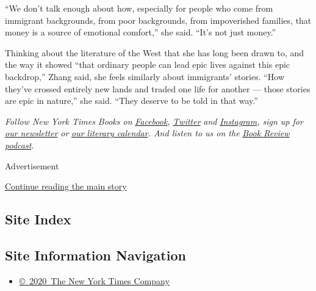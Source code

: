 ``We don't talk enough about how, especially for people who come from
immigrant backgrounds, from poor backgrounds, from impoverished
families, that money is a source of emotional comfort,'' she said.
``It's not just money.''

Thinking about the literature of the West that she has long been drawn
to, and the way it showed ``that ordinary people can lead epic lives
against this epic backdrop,'' Zhang said, she feels similarly about
immigrants' stories. ``How they've crossed entirely new lands and traded
one life for another --- those stories are epic in nature,'' she said.
``They deserve to be told in that way.''

\emph{Follow New York Times Books on}
\href{https://www.facebook.com/nytbooks/}{\emph{Facebook}}\emph{,}
\href{https://twitter.com/nytimesbooks}{\emph{Twitter}} \emph{and}
\href{https://www.instagram.com/nytbooks/}{\emph{Instagram}}\emph{, sign
up for}
\href{https://www.nytimes.com/newsletters/books-review}{\emph{our
newsletter}} \emph{or}
\href{https://www.nytimes.com/interactive/2017/books/books-calendar.html}{\emph{our
literary calendar}}\emph{. And listen to us on the}
\href{https://www.nytimes.com/column/book-review-podcast}{\emph{Book
Review podcast}}\emph{.}

Advertisement

\protect\hyperlink{after-bottom}{Continue reading the main story}

\hypertarget{site-index}{%
\subsection{Site Index}\label{site-index}}

\hypertarget{site-information-navigation}{%
\subsection{Site Information
Navigation}\label{site-information-navigation}}

\begin{itemize}
\tightlist
\item
  \href{https://help.nytimes.com/hc/en-us/articles/115014792127-Copyright-notice}{©~2020~The
  New York Times Company}
\end{itemize}

